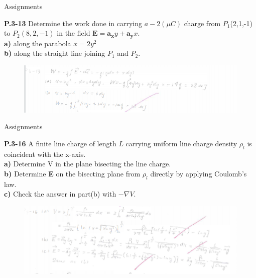 \documentclass[xcolor={dvipsnames}]{beamer}
\begin{document}
\begin{frame}{Assignments}
\begin{block}{\textbf{P.3-13}}
Determine the work done in carrying $a - 2(\mu C)$ charge from $P_1$(2,1,-1) to $P_2(8,2,-1)$ in the field $\boldsymbol{E}=\boldsymbol{a_x}y+\boldsymbol{a_y}x$.\\
\textbf{a)} along the parabola $x=2y^2$\\
\textbf{b)} along the straight line joining $P_1$ and $P_2$.\\
\end{block}
\pause
\begin{figure}[H]
	\centering
	\includegraphics[width=0.9\linewidth]{2_7.png}
\end{figure}
\end{frame}
\begin{frame}{Assignments}
\begin{block}{\textbf{P.3-16}}
A finite line charge of length $L$ carrying uniform line charge density $\rho_l$ is coincident with the x-axis.\\
\textbf{a)} Determine V in the plane bisecting the line charge.\\
\textbf{b)} Determine \textbf{E} on the bisecting plane from $\rho_l$ directly by applying Coulomb's law.\\
\textbf{c)} Check the answer in part(b) with $-\nabla V$.\\
\end{block}
\pause
\begin{figure}[H]
	\centering
	\includegraphics[width=0.9\linewidth]{2_8.png}
\end{figure}
\end{frame}
\end{document}
